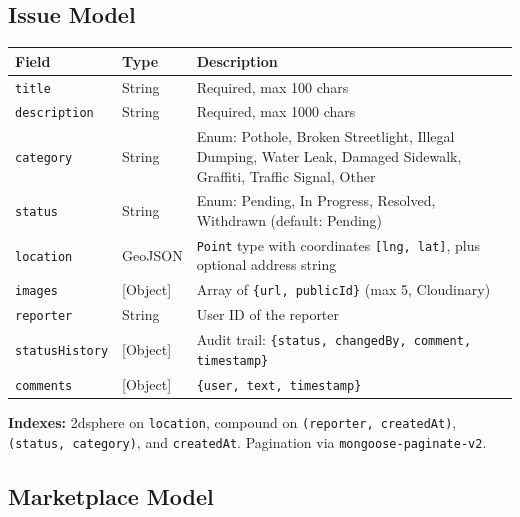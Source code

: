 \documentclass[12pt,a4paper]{article}
\begin{document}
\subsection{Issue Model}

\begin{longtable}{@{}llp{5.5cm}@{}}
\toprule
\textbf{Field} & \textbf{Type} & \textbf{Description} \\
\midrule
\endhead
\texttt{title}       & String  & Required, max 100 chars \\
\texttt{description} & String  & Required, max 1000 chars \\
\texttt{category}    & String  & Enum: Pothole, Broken Streetlight, Illegal Dumping, Water Leak, Damaged Sidewalk, Graffiti, Traffic Signal, Other \\
\texttt{status}      & String  & Enum: Pending, In Progress, Resolved, Withdrawn (default: Pending) \\
\texttt{location}    & GeoJSON & \texttt{Point} type with coordinates \texttt{[lng, lat]}, plus optional address string \\
\texttt{images}      & [Object] & Array of \texttt{\{url, publicId\}} (max 5, Cloudinary) \\
\texttt{reporter}    & String  & User ID of the reporter \\
\texttt{statusHistory} & [Object] & Audit trail: \texttt{\{status, changedBy, comment, timestamp\}} \\
\texttt{comments}    & [Object] & \texttt{\{user, text, timestamp\}} \\
\bottomrule
\end{longtable}

\noindent\textbf{Indexes:} 2dsphere on \texttt{location}, compound on \texttt{(reporter, createdAt)}, \texttt{(status, category)}, and \texttt{createdAt}. Pagination via \texttt{mongoose-paginate-v2}.

\subsection{Marketplace Model}
\end{document}
